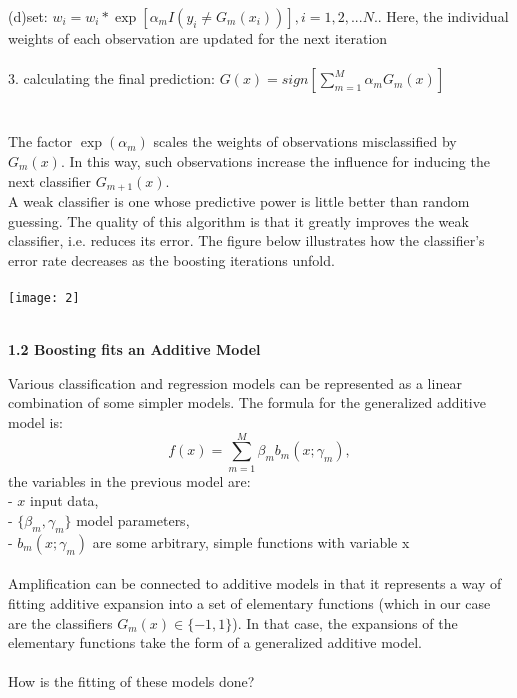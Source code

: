 \documentclass[12pt, letterpaper, twoside]{article}
\begin{document}
\hspace*{4ex}(d)\space set: $w_i=w_i*\exp [\alpha_m I(y_i\neq G_m(x_i))], i=1,2,...N.$. Here, the individual weights of each observation are updated for the next iteration\\\\
3. calculating the final prediction: $G(x)=sign[\sum_{m=1}^M\alpha_m G_m(x)]$\\\\\\
The factor $\exp(\alpha_m)$ scales the weights of observations misclassified by $G_m(x)$.
In this way, such observations increase the influence for inducing the next classifier $G_{m+1}(x)$. \\
A weak classifier is one whose predictive power is little better than random guessing. The quality of this algorithm is that it greatly improves the weak classifier, i.e. reduces its error.
The figure below illustrates how the classifier's error rate decreases as the boosting iterations unfold.\\\\
\texttt{[image: 2]}\\
\begin{center}
\textbf{\large{\\1.2 Boosting fits an Additive Model}\\}
\end{center}
Various classification and regression models can be represented as a linear combination of some simpler models. The formula for the generalized additive model is:
\begin{equation*}
f(x)=\sum_{m=1}^M \beta_m b_m(x;\gamma_m),
\end{equation*}
the variables in the previous model are:\\
- $x$ input data,\\
- $\{\beta_m,\gamma_m\}$ model parameters,\\
- $b_m(x;\gamma_m)$ are some arbitrary, simple functions with variable x\\\\
Amplification can be connected to additive models in that it represents a way of fitting additive expansion into a set of elementary functions (which in our case are the classifiers $G_m(x)\in\{-1,1\}$). In that case, the expansions of the elementary functions take the form of a generalized additive model.\\\\
How is the fitting of these models done?\\
\end{document}
